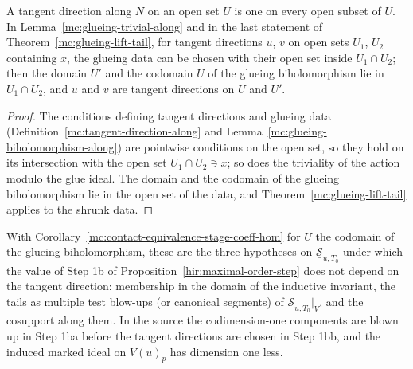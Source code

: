 \begin{lemma}
\label{mc:glueing-data-shrink}
\leanok
A tangent direction along \(N\) on an open set \(U\) is one on every open subset of \(U\). In Lemma~\ref{mc:glueing-trivial-along} and in the last statement of
Theorem~\ref{mc:glueing-lift-tail}, for tangent directions \(u\), \(v\) on open sets \(U_1\), \(U_2\) containing \(x\), the glueing data can be chosen with their open
set inside \(U_1\cap U_2\); then the domain \(U'\) and the codomain \(U\) of the glueing biholomorphism lie in \(U_1\cap U_2\), and \(u\) and \(v\) are tangent directions on
\(U\) and \(U'\).
\end{lemma}
\begin{proof}
\leanok
The conditions defining tangent directions and glueing data (Definition~\ref{mc:tangent-direction-along} and Lemma~\ref{mc:glueing-biholomorphism-along}) are pointwise
conditions on the open set, so they hold on its intersection with the open set \(U_1\cap U_2\ni x\); so does the triviality of the action modulo the glue ideal. The
domain and the codomain of the glueing biholomorphism lie in the open set of the data, and Theorem~\ref{mc:glueing-lift-tail} applies to the shrunk data.
\end{proof}
With Corollary~\ref{mc:contact-equivalence-stage-coeff-hom} for \(U\) the codomain of the glueing biholomorphism, these are the three hypotheses on
\(\underline{\mathcal S}_{u,T_0}\) under which the value of Step 1b of Proposition~\ref{hir:maximal-order-step} does not depend on the tangent direction: membership in the
domain of the inductive invariant, the tails as multiple test blow-ups (or canonical segments) of \(\underline{\mathcal S}_{u,T_0}|_V\), and the cosupport along them.
In the source the codimension-one components are blown up in Step 1ba before the tangent directions are chosen in Step 1bb, and the induced marked ideal on
\(V(u)_p\) has dimension one less.

